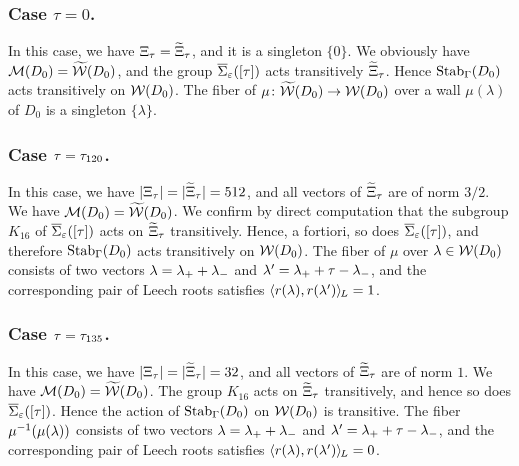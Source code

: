 \documentclass{amsart} %
\begin{document}
\subsubsection{Case $\tau=0$.}
%
In this case,
we have $\Xi_{\tau}=\widetilde{\Xi}_{\tau}$,
and it is a singleton $\{0\}$.
We obviously have $\mathord{\mathcal{M}}(D_0)=\widetilde{\mathord{\mathcal{W}}}(D_0)$,
and the group $\overline{\Sigma}_{\varepsilon} ([\tau])$ acts transitively $\widetilde{\Xi}_{\tau}$.
Hence $\operatorname{Stab}_{\Gamma}(D_0)$ acts  transitively on  $\mathord{\mathcal{W}}(D_0)$.
The fiber of $\mu\colon \widetilde{\mathord{\mathcal{W}}}(D_0)\to\mathord{\mathcal{W}}(D_0)$ 
over a wall $\mu(\lambda)$ of $D_0$ is a singleton $\{\lambda\}$.
%
%
\subsubsection{Case $\tau=\tau_{120}$.}
%
In this case,
we have $|\Xi_{\tau}|=|\widetilde{\Xi}_{\tau}|=512$,
and all vectors of $\widetilde{\Xi}_{\tau}$ are of norm $3/2$.
We have $\mathord{\mathcal{M}}(D_0)=\widetilde{\mathord{\mathcal{W}}}(D_0)$.
We confirm by direct computation that 
the  subgroup $K_{16}$  of $\overline{\Sigma}_{\varepsilon} ([\tau])$
acts on $\widetilde{\Xi}_{\tau}$ transitively.
Hence, a fortiori, so does $\overline{\Sigma}_{\varepsilon} ([\tau])$, and 
therefore  $\operatorname{Stab}_{\Gamma}(D_0)$ acts  transitively on  $\mathord{\mathcal{W}}(D_0)$.
The fiber 
 of $\mu$ over $\lambda\in \mathord{\mathcal{W}}(D_0)$ consists 
of two vectors
$\lambda={\lambda}_{+}+{\lambda}_{-}$ and $\lambda^{\prime}={\lambda}_{+}+\tau-{\lambda}_{-}$, and 
the corresponding pair of Leech roots 
 satisfies
$\langle r(\lambda), r(\lambda^{\prime}) \rangle_{\hskip -1pt L}=1$.
%
\subsubsection{Case $\tau=\tau_{135}$.}
In this case,
we have $|\Xi_{\tau}|=|\widetilde{\Xi}_{\tau}|=32$,
and all vectors of $\widetilde{\Xi}_{\tau}$ are of norm $1$.
We have $\mathord{\mathcal{M}}(D_0)=\widetilde{\mathord{\mathcal{W}}}(D_0)$.
The group $K_{16}$  %
acts on $\widetilde{\Xi}_{\tau}$ transitively,
and hence so does $\overline{\Sigma}_{\varepsilon} ([\tau])$.
Hence the action of $\operatorname{Stab}_{\Gamma}(D_0)$ on  $\mathord{\mathcal{W}}(D_0)$ is transitive.
The fiber 
 $\mu^{-1}(\mu(\lambda))$ 
consists of two vectors
$\lambda={\lambda}_{+}+{\lambda}_{-}$ and $\lambda^{\prime}={\lambda}_{+}+\tau-{\lambda}_{-}$, and 
the corresponding pair of Leech roots 
 satisfies
$\langle r(\lambda), r(\lambda^{\prime}) \rangle_{\hskip -1pt L}=0$.
%
 
\end{document}
